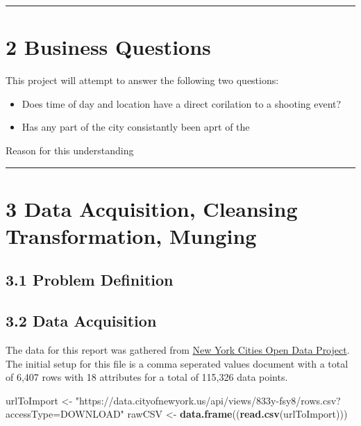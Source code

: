 \documentclass[]{article}
\newenvironment{Shaded}{\begin{snugshade}}{\end{snugshade}}
\newcommand{\KeywordTok}[1]{\textcolor[rgb]{0.13,0.29,0.53}{\textbf{#1}}}
\newcommand{\StringTok}[1]{\textcolor[rgb]{0.31,0.60,0.02}{#1}}
\newcommand{\NormalTok}[1]{#1}
\providecommand{\tightlist}{%
  \setlength{\itemsep}{0pt}\setlength{\parskip}{0pt}}
\begin{document}
\begin{center}\rule{0.5\linewidth}{\linethickness}\end{center}

\section{2 Business Questions}\label{business-questions}

This project will attempt to answer the following two questions:

\begin{itemize}
\tightlist
\item
  Does time of day and location have a direct corilation to a shooting
  event?
\item
  Has any part of the city consistantly been aprt of the
\end{itemize}

Reason for this understanding

\begin{center}\rule{0.5\linewidth}{\linethickness}\end{center}

\section{3 Data Acquisition, Cleansing Transformation,
Munging}\label{data-acquisition-cleansing-transformation-munging}

\subsection{3.1 Problem Definition}\label{problem-definition}

\subsection{3.2 Data Acquisition}\label{data-acquisition}

The data for this report was gathered from
\href{https://data.cityofnewyork.us/Public-Safety/NYPD-Shooting-Incident-Data-Historic-/833y-fsy8}{New
York Cities Open Data Project}. The initial setup for this file is a
comma seperated values document with a total of 6,407 rows with 18
attributes for a total of 115,326 data points.

\begin{Shaded}
\begin{Highlighting}[]
\NormalTok{urlToImport <-}\StringTok{ "https://data.cityofnewyork.us/api/views/833y-fsy8/rows.csv?accessType=DOWNLOAD"}
\NormalTok{rawCSV <-}\StringTok{ }\KeywordTok{data.frame}\NormalTok{((}\KeywordTok{read.csv}\NormalTok{(urlToImport)))}
\end{Highlighting}
\end{Shaded}
\end{document}
